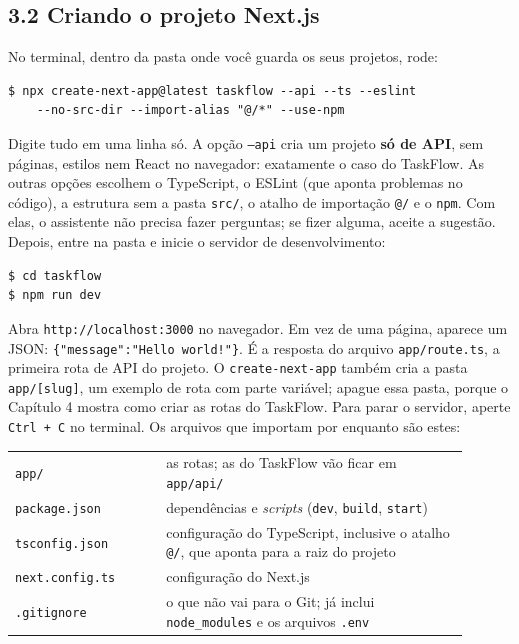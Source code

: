 \subsection{3.2 Criando o projeto Next.js}

No terminal, dentro da pasta onde você guarda os seus projetos, rode:

\begin{codigo}
\begin{Verbatim}[breaklines=true, breaksymbolleft={}, fontsize=\footnotesize]
$ npx create-next-app@latest taskflow --api --ts --eslint
    --no-src-dir --import-alias "@/*" --use-npm
\end{Verbatim}
\end{codigo}

Digite tudo em uma linha só. A opção \texttt{--api} cria um projeto \textbf{só de API}, sem páginas, estilos nem React no navegador: exatamente o caso do TaskFlow. As outras opções escolhem o TypeScript, o ESLint (que aponta problemas no código), a estrutura sem a pasta \texttt{src/}, o atalho de importação \texttt{@/} e o \texttt{npm}. Com elas, o assistente não precisa fazer perguntas; se fizer alguma, aceite a sugestão. Depois, entre na pasta e inicie o servidor de desenvolvimento:

\begin{codigo}
\begin{Verbatim}[breaklines=true, breaksymbolleft={}, fontsize=\footnotesize]
$ cd taskflow
$ npm run dev
\end{Verbatim}
\end{codigo}

Abra \texttt{http://localhost:3000} no navegador. Em vez de uma página, aparece um JSON: \texttt{\{"message":"Hello world!"\}}. É a resposta do arquivo \texttt{app/route.ts}, a primeira rota de API do projeto. O \texttt{create-next-app} também cria a pasta \texttt{app/[slug]}, um exemplo de rota com parte variável; apague essa pasta, porque o Capítulo 4 mostra como criar as rotas do TaskFlow. Para parar o servidor, aperte \texttt{Ctrl + C} no terminal. Os arquivos que importam por enquanto são estes:

\begin{center}
\begin{tabular}{@{}P{0.3\linewidth}P{0.6\linewidth}@{}}
\toprule
{}
 &  \\
\midrule
\texttt{app/} & as rotas; as do TaskFlow vão ficar em \texttt{app/api/} \\
 \texttt{package.json} & dependências e \textit{scripts} (\texttt{dev}, \texttt{build}, \texttt{start}) \\
\texttt{tsconfig.json} & configuração do TypeScript, inclusive o atalho \texttt{@/}, que aponta para a raiz do projeto \\
 \texttt{next.config.ts} & configuração do Next.js \\
\texttt{.gitignore} & o que não vai para o Git; já inclui \texttt{node\_modules} e os arquivos \texttt{.env} \\
\bottomrule
\end{tabular}
\end{center}

